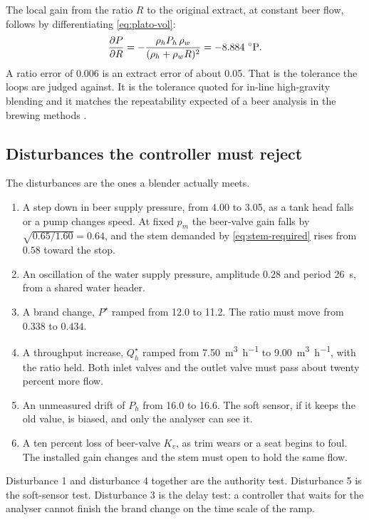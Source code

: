 The local gain from the ratio $R$ to the original extract, at constant beer flow, follows by differentiating \eqref{eq:plato-vol}:
\begin{equation}
\label{eq:dPdR}
\frac{\partial P}{\partial R} = -\frac{\rho_h P_h\, \rho_w}{(\rho_h + \rho_w R)^2} = -8.884\ ^{\circ}\mathrm{P}.
\end{equation}
A ratio error of $0.006$ is an extract error of about \SI{0.05}{\plato}. That is the tolerance the loops are judged against. It is the tolerance quoted for in-line high-gravity blending and it matches the repeatability expected of a beer analysis in the brewing methods \cite{mebak2013wort,ebcanalytica,stewart2010highgravity}.

\subsection{Disturbances the controller must reject}

The disturbances are the ones a blender actually meets.

\begin{enumerate}
\item A step down in beer supply pressure, from \SI{4.00}{\barg} to \SI{3.05}{\barg}, as a tank head falls or a pump changes speed. At fixed $p_m$ the beer-valve gain falls by $\sqrt{0.65/1.60} = 0.64$, and the stem demanded by \eqref{eq:stem-required} rises from $0.58$ toward the stop.
\item An oscillation of the water supply pressure, amplitude \SI{0.28}{\barg} and period \SI{26}{s}, from a shared water header.
\item A brand change, $P^\star$ ramped from \SI{12.0}{\plato} to \SI{11.2}{\plato}. The ratio must move from $0.338$ to $0.434$.
\item A throughput increase, $Q_h^\star$ ramped from \SI{7.50}{\cubic\metre\per\hour} to \SI{9.00}{\cubic\metre\per\hour}, with the ratio held. Both inlet valves and the outlet valve must pass about twenty percent more flow.
\item An unmeasured drift of $P_h$ from \SI{16.0}{\plato} to \SI{16.6}{\plato}. The soft sensor, if it keeps the old value, is biased, and only the analyser can see it.
\item A ten percent loss of beer-valve $K_v$, as trim wears or a seat begins to foul. The installed gain changes and the stem must open to hold the same flow.
\end{enumerate}

Disturbance 1 and disturbance 4 together are the authority test. Disturbance 5 is the soft-sensor test. Disturbance 3 is the delay test: a controller that waits for the analyser cannot finish the brand change on the time scale of the ramp.

